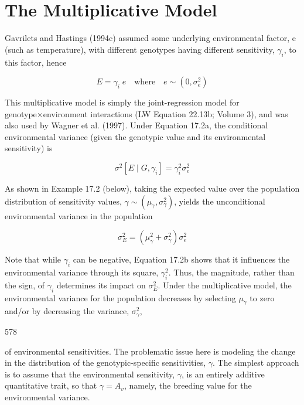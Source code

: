 \documentclass{article}
\begin{document}
\section{The Multiplicative Model}
Gavrilets and Hastings (1994c) assumed some underlying environmental factor, e (such as temperature), with different genotypes having different sensitivity,  $ \gamma_{i} $, to this factor, hence

\begin{equation}
E=\gamma_{i}\;e\quad\mathrm{w h e r e}\quad e\sim(0,\sigma_{e}^{2})
\tag{17.2a}
\label{eq:17_2a}
\end{equation}

This multiplicative model is simply the joint-regression model for genotype×environment interactions (LW Equation 22.13b; Volume 3), and was also used by Wagner et al. (1997). Under Equation 17.2a, the conditional environmental variance (given the genotypic value and its environmental sensitivity) is

\begin{equation}
\sigma^{2}[E\mid G,\gamma_{i}]=\gamma_{i}^{2}\sigma_{e}^{2}
\tag{17.2b}
\label{eq:17_2b}
\end{equation}

As shown in Example 17.2 (below), taking the expected value over the population distribution of sensitivity values,  $ \gamma \sim (\mu_{\gamma}, \sigma_{\gamma}^{2}) $, yields the unconditional environmental variance in the population

\begin{equation}
\sigma_{E}^{2}=\left(\mu_{\gamma}^{2}+\sigma_{\gamma}^{2}\right)\sigma_{e}^{2}
\tag{17.2c}
\label{eq:17_2c}
\end{equation}

Note that while  $ \gamma_i $ can be negative, Equation 17.2b shows that it influences the environmental variance through its square,  $ \gamma_i^2 $. Thus, the magnitude, rather than the sign, of  $ \gamma_i $ determines its impact on  $ \sigma_E^2 $. Under the multiplicative model, the environmental variance for the population decreases by selecting  $ \mu_\gamma $ to zero and/or by decreasing the variance,  $ \sigma_\gamma^2 $,

578

of environmental sensitivities. The problematic issue here is modeling the change in the distribution of the genotypic-specific sensitivities,  $ \gamma $. The simplest approach is to assume that the environmental sensitivity,  $ \gamma $, is an entirely additive quantitative trait, so that  $ \gamma = A_v $, namely, the breeding value for the environmental variance.
\end{document}

